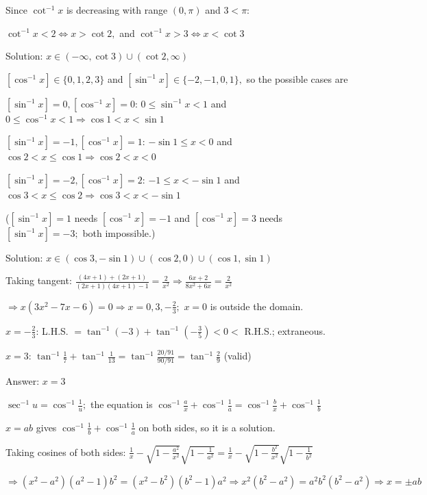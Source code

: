   Since $\cot^{-1}x$ is decreasing with range $(0, \pi)$ and $3 < \pi$:

  $\cot^{-1}x < 2 \iff x > \cot2,$ and $\cot^{-1}x > 3 \iff x < \cot3$

  Solution: $x\in(-\infty, \cot3)\cup(\cot2, \infty)$

\item $[\cos^{-1}x]\in\{0, 1, 2, 3\}$ and $[\sin^{-1}x]\in\{-2, -1, 0, 1\},$ so the possible cases are

  $[\sin^{-1}x] = 0, [\cos^{-1}x] = 0$: $0\leq\sin^{-1}x < 1$ and $0\leq\cos^{-1}x < 1 \Rightarrow \cos1 < x < \sin1$

  $[\sin^{-1}x] = -1, [\cos^{-1}x] = 1$: $-\sin1\leq x < 0$ and $\cos2 < x\leq\cos1 \Rightarrow \cos2 < x < 0$

  $[\sin^{-1}x] = -2, [\cos^{-1}x] = 2$: $-1\leq x < -\sin1$ and $\cos3 < x\leq\cos2 \Rightarrow \cos3 < x < -\sin1$

  ($[\sin^{-1}x] = 1$ needs $[\cos^{-1}x] = -1$ and $[\cos^{-1}x] = 3$ needs $[\sin^{-1}x] = -3;$ both impossible.)

  Solution: $x\in(\cos3, -\sin1)\cup(\cos2, 0)\cup(\cos1, \sin1)$

\item Taking tangent: $\frac{(4x + 1) + (2x + 1)}{(2x + 1)(4x + 1) - 1} = \frac{2}{x^2} \Rightarrow \frac{6x + 2}{8x^2 + 6x} =
  \frac{2}{x^2}$

  $\Rightarrow x(3x^2 - 7x - 6) = 0 \Rightarrow x = 0, 3, -\frac{2}{3};$ $x = 0$ is outside the domain.

  $x = -\frac{2}{3}$: L.H.S. $= \tan^{-1}(-3) + \tan^{-1}\left(-\frac{3}{5}\right) < 0 <$ R.H.S.; extraneous.

  $x = 3$: $\tan^{-1}\frac{1}{7} + \tan^{-1}\frac{1}{13} = \tan^{-1}\frac{20/91}{90/91} = \tan^{-1}\frac{2}{9}$ (valid)

  Answer: $x = 3$

\item $\sec^{-1}u = \cos^{-1}\frac{1}{u};$ the equation is $\cos^{-1}\frac{a}{x} + \cos^{-1}\frac{1}{a} = \cos^{-1}\frac{b}{x} +
  \cos^{-1}\frac{1}{b}$

  $x = ab$ gives $\cos^{-1}\frac{1}{b} + \cos^{-1}\frac{1}{a}$ on both sides, so it is a solution.

  Taking cosines of both sides: $\frac{1}{x} - \sqrt{1 - \frac{a^2}{x^2}}\sqrt{1 - \frac{1}{a^2}} = \frac{1}{x} - \sqrt{1 -
    \frac{b^2}{x^2}}\sqrt{1 - \frac{1}{b^2}}$

  $\Rightarrow (x^2 - a^2)(a^2 - 1)b^2 = (x^2 - b^2)(b^2 - 1)a^2 \Rightarrow x^2(b^2 - a^2) = a^2b^2(b^2 - a^2) \Rightarrow x =
  \pm ab$

